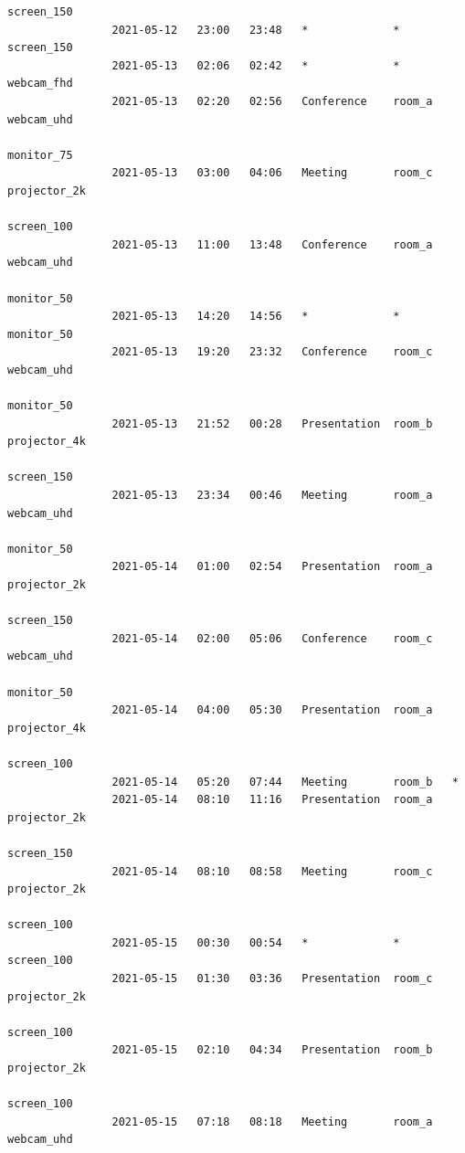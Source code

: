 \documentclass{article}
\begin{document}
\begin{Verbatim}[gobble=8]
                                                                    screen_150
                2021-05-12   23:00   23:48   *             *        screen_150
                2021-05-13   02:06   02:42   *             *        webcam_fhd
                2021-05-13   02:20   02:56   Conference    room_a   webcam_uhd
                                                                    monitor_75
                2021-05-13   03:00   04:06   Meeting       room_c   projector_2k
                                                                    screen_100
                2021-05-13   11:00   13:48   Conference    room_a   webcam_uhd
                                                                    monitor_50
                2021-05-13   14:20   14:56   *             *        monitor_50
                2021-05-13   19:20   23:32   Conference    room_c   webcam_uhd
                                                                    monitor_50
                2021-05-13   21:52   00:28   Presentation  room_b   projector_4k
                                                                    screen_150
                2021-05-13   23:34   00:46   Meeting       room_a   webcam_uhd
                                                                    monitor_50
                2021-05-14   01:00   02:54   Presentation  room_a   projector_2k
                                                                    screen_150
                2021-05-14   02:00   05:06   Conference    room_c   webcam_uhd
                                                                    monitor_50
                2021-05-14   04:00   05:30   Presentation  room_a   projector_4k
                                                                    screen_100
                2021-05-14   05:20   07:44   Meeting       room_b   *
                2021-05-14   08:10   11:16   Presentation  room_a   projector_2k
                                                                    screen_150
                2021-05-14   08:10   08:58   Meeting       room_c   projector_2k
                                                                    screen_100
                2021-05-15   00:30   00:54   *             *        screen_100
                2021-05-15   01:30   03:36   Presentation  room_c   projector_2k
                                                                    screen_100
                2021-05-15   02:10   04:34   Presentation  room_b   projector_2k
                                                                    screen_100
                2021-05-15   07:18   08:18   Meeting       room_a   webcam_uhd

\end{Verbatim}
\end{document}
